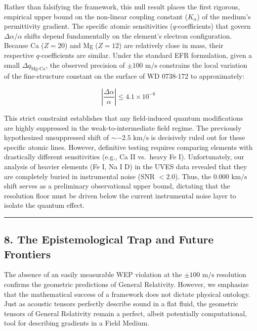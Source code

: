 \documentclass[
]{article}
\begin{document}
Rather than falsifying the framework, this null result places the first
rigorous, empirical upper bound on the non-linear coupling constant
(\(K_{\alpha}\)) of the medium's permittivity gradient. The specific
atomic sensitivities (\(q\)-coefficients) that govern
\(\Delta \alpha / \alpha\) shifts depend fundamentally on the element's
electron configuration. Because Ca (\(Z=20\)) and Mg (\(Z=12\)) are
relatively close in mass, their respective \(q\)-coefficients are
similar. Under the standard EFR formulation, given a small
\(\Delta q_{\text{Mg-Ca}}\), the observed precision of
\(\pm 100 \text{ m/s}\) constrains the local variation of the
fine-structure constant on the surface of WD 0738-172 to approximately:

\[ \left| \frac{\Delta \alpha}{\alpha} \right| \le 4.1 \times 10^{-6} \]

This strict constraint establishes that any field-induced quantum
modifications are highly suppressed in the weak-to-intermediate field
regime. The previously hypothesized unsuppressed shift of
\(\sim -2.5 \text{ km/s}\) is decisively ruled out for these specific
atomic lines. However, definitive testing requires comparing elements
with drastically different sensitivities (e.g., Ca II vs.~heavy Fe I).
Unfortunately, our analysis of heavier elements (Fe I, Na I D) in the
UVES data revealed that they are completely buried in instrumental noise
(SNR \(< 2.0\)). Thus, the \(0.000 \text{ km/s}\) shift serves as a
preliminary observational upper bound, dictating that the resolution
floor must be driven below the current instrumental noise layer to
isolate the quantum effect.

\begin{center}\rule{0.5\linewidth}{0.5pt}\end{center}

\subsection{8. The Epistemological Trap and Future
Frontiers}\label{the-epistemological-trap-and-future-frontiers}

The absence of an easily measurable WEP violation at the
\(\pm 100 \text{ m/s}\) resolution confirms the geometric predictions of
General Relativity. However, we emphasize that the mathematical success
of a framework does not dictate physical ontology. Just as acoustic
tensors perfectly describe sound in a flat fluid, the geometric tensors
of General Relativity remain a perfect, albeit potentially
computational, tool for describing gradients in a Field Medium.
\end{document}
